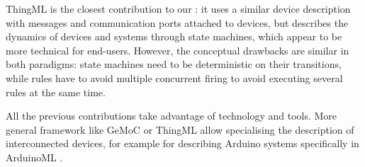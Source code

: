 ThingML \cite{Harrand-Fleurey-Morin-Husa:2016} is the closest contribution to our \DSL: it uses a similar device description with messages and communication ports attached to devices, but describes the dynamics of devices and systems through state machines, which appear to be more technical for end-users. However, the conceptual drawbacks are similar in both paradigms: state machines need to be deterministic on their transitions, while rules have to avoid multiple concurrent firing to avoid executing several rules at the same time. 

All the previous contributions take advantage of \MDE technology and tools. More general \MDE framework like GeMoC \cite{Bousse-Degueule-Vojtisek-etAl:2016} or ThingML allow specialising the description of interconnected devices, for example for describing Arduino systems specifically in ArduinoML \cite{Mosser-Collet-BlayFornarino:2014}.